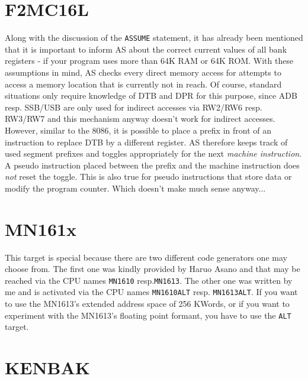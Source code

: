 \documentclass[12pt,twoside]{report}
\newcommand{\tty}[1]{{\tt #1}}
\begin{document}

\section{F2MC16L}

Along with the discussion of the {\tt ASSUME} statement, it has already
been mentioned that it is important to inform AS about the correct current
values of all bank registers - if your program uses more than 64K RAM or
64K ROM.  With these assumptions in mind, AS checks every direct memory
access for attempts to access a memory location that is currently not in
reach.  Of course, standard situations only require knowledge of DTB and
DPR for this purpose, since ADB resp. SSB/USB are only used for indirect
accesses via RW2/RW6 resp. RW3/RW7 and this mechanism anyway doesn't work
for indirect accesses.  However, similar to the 8086, it is possible to
place a prefix in front of an instruction to replace DTB by a different
register.  AS therefore keeps track of used segment prefixes and
toggles appropriately for the next {\em machine instruction}.  A pseudo
instruction placed between the prefix and the machine instruction does
{\em not} reset the toggle.  This is also true for pseudo instructions
that store data or modify the program counter.  Which doesn't make much
sense anyway...


\section{MN161x}

This target is special because there are two different code generators one may
choose from.  The first one was kindly provided by Haruo Asano and that may be
reached via the CPU names \tty{MN1610} resp.\tty{MN1613}.  The other one was
written by me and is activated via the CPU names \tty{MN1610ALT} resp.
\tty{MN1613ALT}.  If you want to use the MN1613's extended address space of
256 KWords, or if you want to experiment with the MN1613's floating point
formant, you have to use the \tty{ALT} target.


\section{KENBAK}
\end{document}
